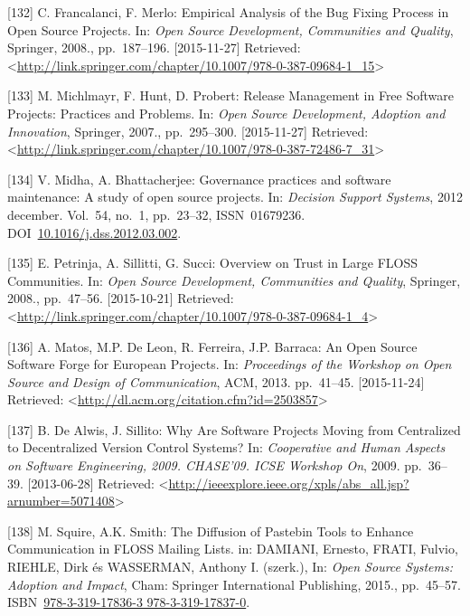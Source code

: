 \documentclass[12pt,magyar,a4paper,oneside]{scrreprt}
\begin{document}
\leavevmode\hypertarget{ref-francalanci_empirical_2008}{}%
{[}132{]} C. Francalanci, F. Merlo: Empirical Analysis of the Bug Fixing
Process in Open Source Projects. In: \emph{Open Source Development,
Communities and Quality}, Springer, 2008., pp.~187--196.
{[}2015-11-27{]} Retrieved:
\textless{}\url{http://link.springer.com/chapter/10.1007/978-0-387-09684-1_15}\textgreater{}

\leavevmode\hypertarget{ref-michlmayr_release_2007}{}%
{[}133{]} M. Michlmayr, F. Hunt, D. Probert: Release Management in Free
Software Projects: Practices and Problems. In: \emph{Open Source
Development, Adoption and Innovation}, Springer, 2007., pp.~295--300.
{[}2015-11-27{]} Retrieved:
\textless{}\url{http://link.springer.com/chapter/10.1007/978-0-387-72486-7_31}\textgreater{}

\leavevmode\hypertarget{ref-midha_governance_2012}{}%
{[}134{]} V. Midha, A. Bhattacherjee: Governance practices and software
maintenance: A study of open source projects. In: \emph{Decision Support
Systems}, 2012 december. Vol.~54, no.~1, pp.~23--32, ISSN~01679236.
DOI~\href{https://doi.org/10.1016/j.dss.2012.03.002}{10.1016/j.dss.2012.03.002}.

\leavevmode\hypertarget{ref-petrinja_overview_2008}{}%
{[}135{]} E. Petrinja, A. Sillitti, G. Succi: Overview on Trust in Large
FLOSS Communities. In: \emph{Open Source Development, Communities and
Quality}, Springer, 2008., pp.~47--56. {[}2015-10-21{]} Retrieved:
\textless{}\url{http://link.springer.com/chapter/10.1007/978-0-387-09684-1_4}\textgreater{}

\leavevmode\hypertarget{ref-matos_open_2013}{}%
{[}136{]} A. Matos, M.P. De Leon, R. Ferreira, J.P. Barraca: An Open
Source Software Forge for European Projects. In: \emph{Proceedings of
the Workshop on Open Source and Design of Communication}, ACM, 2013.
pp.~41--45. {[}2015-11-24{]} Retrieved:
\textless{}\url{http://dl.acm.org/citation.cfm?id=2503857}\textgreater{}

\leavevmode\hypertarget{ref-de_alwis_why_2009}{}%
{[}137{]} B. De Alwis, J. Sillito: Why Are Software Projects Moving from
Centralized to Decentralized Version Control Systems? In:
\emph{Cooperative and Human Aspects on Software Engineering, 2009.
CHASE'09. ICSE Workshop On}, 2009. pp.~36--39. {[}2013-06-28{]}
Retrieved:
\textless{}\url{http://ieeexplore.ieee.org/xpls/abs_all.jsp?arnumber=5071408}\textgreater{}

\leavevmode\hypertarget{ref-damiani_diffusion_2015}{}%
{[}138{]} M. Squire, A.K. Smith: The Diffusion of Pastebin Tools to
Enhance Communication in FLOSS Mailing Lists. in: DAMIANI, Ernesto,
FRATI, Fulvio, RIEHLE, Dirk és WASSERMAN, Anthony I. (szerk.), In:
\emph{Open Source Systems: Adoption and Impact}, Cham: Springer
International Publishing, 2015., pp.~45--57.
ISBN~\href{https://worldcat.org/isbn/978-3-319-17836-3\%20978-3-319-17837-0}{978-3-319-17836-3 978-3-319-17837-0}.
\end{document}

